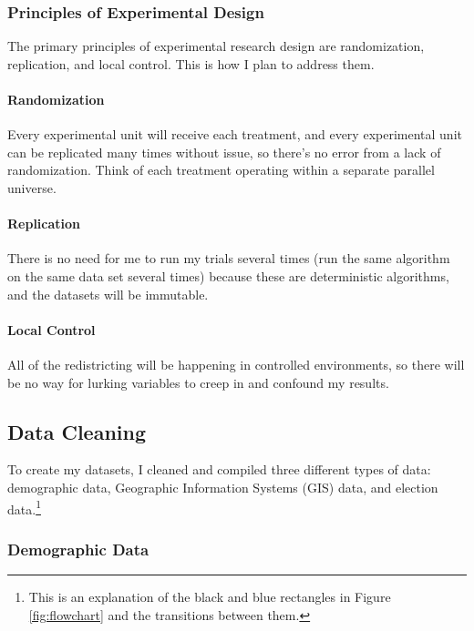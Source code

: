 \subsubsection{Principles of Experimental Design}

The primary principles of experimental research design are randomization, replication, and local control. This is how I plan to address them. 

\paragraph{Randomization}

Every experimental unit will receive each treatment, and every experimental unit can be replicated many times without issue, so there’s no error from a lack of randomization. Think of each treatment operating within a separate parallel universe. 

\paragraph{Replication}

There is no need for me to run my trials several times (run the same algorithm on the same data set several times) because these are deterministic algorithms, and the datasets will be immutable. 

\paragraph{Local Control}

All of the redistricting will be happening in controlled environments, so there will be no way for lurking variables to creep in and confound my results. 

\subsection{Data Cleaning}

To create my datasets, I cleaned and compiled three different types of data: demographic data, Geographic Information Systems (GIS) data, and election data.\footnote{This is an explanation of the black and blue rectangles in Figure \ref{fig:flowchart} and the transitions between them.} 

\subsubsection{Demographic Data}

